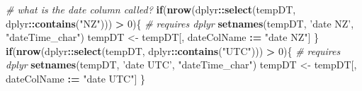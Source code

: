 \documentclass[]{article}
\newenvironment{Shaded}{\begin{snugshade}}{\end{snugshade}}
\newcommand{\KeywordTok}[1]{\textcolor[rgb]{0.13,0.29,0.53}{\textbf{#1}}}
\newcommand{\DecValTok}[1]{\textcolor[rgb]{0.00,0.00,0.81}{#1}}
\newcommand{\StringTok}[1]{\textcolor[rgb]{0.31,0.60,0.02}{#1}}
\newcommand{\CommentTok}[1]{\textcolor[rgb]{0.56,0.35,0.01}{\textit{#1}}}
\newcommand{\ControlFlowTok}[1]{\textcolor[rgb]{0.13,0.29,0.53}{\textbf{#1}}}
\newcommand{\OperatorTok}[1]{\textcolor[rgb]{0.81,0.36,0.00}{\textbf{#1}}}
\newcommand{\ErrorTok}[1]{\textcolor[rgb]{0.64,0.00,0.00}{\textbf{#1}}}
\newcommand{\NormalTok}[1]{#1}
\begin{document}
\begin{Shaded}
\begin{Highlighting}[]
    \CommentTok{# what is the date column called?}
      \ControlFlowTok{if}\NormalTok{(}\KeywordTok{nrow}\NormalTok{(dplyr}\OperatorTok{::}\KeywordTok{select}\NormalTok{(tempDT, dplyr}\OperatorTok{::}\KeywordTok{contains}\NormalTok{(}\StringTok{"NZ"}\NormalTok{))) }\OperatorTok{>}\StringTok{ }\DecValTok{0}\NormalTok{)\{ }\CommentTok{# requires dplyr}
        \KeywordTok{setnames}\NormalTok{(tempDT, }\StringTok{'date NZ'}\NormalTok{, }\StringTok{"dateTime_char"}\NormalTok{)}
\NormalTok{        tempDT <-}\StringTok{ }\NormalTok{tempDT[, dateColName }\OperatorTok{:}\ErrorTok{=}\StringTok{ "date NZ"}\NormalTok{]}
\NormalTok{      \} }
      \ControlFlowTok{if}\NormalTok{(}\KeywordTok{nrow}\NormalTok{(dplyr}\OperatorTok{::}\KeywordTok{select}\NormalTok{(tempDT, dplyr}\OperatorTok{::}\KeywordTok{contains}\NormalTok{(}\StringTok{"UTC"}\NormalTok{))) }\OperatorTok{>}\StringTok{ }\DecValTok{0}\NormalTok{)\{ }\CommentTok{# requires dplyr}
        \KeywordTok{setnames}\NormalTok{(tempDT, }\StringTok{'date UTC'}\NormalTok{, }\StringTok{"dateTime_char"}\NormalTok{)}
\NormalTok{        tempDT <-}\StringTok{ }\NormalTok{tempDT[, dateColName }\OperatorTok{:}\ErrorTok{=}\StringTok{ "date UTC"}\NormalTok{]}
\NormalTok{      \}}
      

\end{Highlighting}
\end{Shaded}
\end{document}
